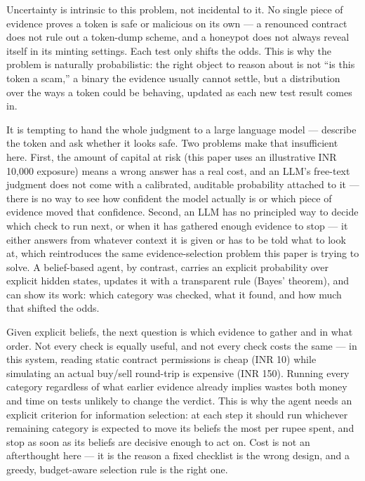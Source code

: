 \documentclass[11pt]{article}
\begin{document}
Uncertainty is intrinsic to this problem, not incidental to it. No single piece of evidence proves a token is safe or malicious on its own --- a renounced contract does not rule out a token-dump scheme, and a honeypot does not always reveal itself in its minting settings. Each test only shifts the odds. This is why the problem is naturally probabilistic: the right object to reason about is not ``is this token a scam,'' a binary the evidence usually cannot settle, but a distribution over the ways a token could be behaving, updated as each new test result comes in.

It is tempting to hand the whole judgment to a large language model --- describe the token and ask whether it looks safe. Two problems make that insufficient here. First, the amount of capital at risk (this paper uses an illustrative INR 10,000 exposure) means a wrong answer has a real cost, and an LLM's free-text judgment does not come with a calibrated, auditable probability attached to it --- there is no way to see how confident the model actually is or which piece of evidence moved that confidence. Second, an LLM has no principled way to decide which check to run next, or when it has gathered enough evidence to stop --- it either answers from whatever context it is given or has to be told what to look at, which reintroduces the same evidence-selection problem this paper is trying to solve. A belief-based agent, by contrast, carries an explicit probability over explicit hidden states, updates it with a transparent rule (Bayes' theorem), and can show its work: which category was checked, what it found, and how much that shifted the odds.

Given explicit beliefs, the next question is which evidence to gather and in what order. Not every check is equally useful, and not every check costs the same --- in this system, reading static contract permissions is cheap (INR 10) while simulating an actual buy/sell round-trip is expensive (INR 150). Running every category regardless of what earlier evidence already implies wastes both money and time on tests unlikely to change the verdict. This is why the agent needs an explicit criterion for information selection: at each step it should run whichever remaining category is expected to move its beliefs the most per rupee spent, and stop as soon as its beliefs are decisive enough to act on. Cost is not an afterthought here --- it is the reason a fixed checklist is the wrong design, and a greedy, budget-aware selection rule is the right one.
\end{document}
